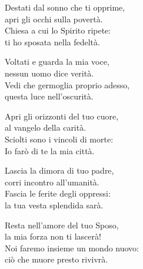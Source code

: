 

\spazio

\strofa Destati dal sonno che ti opprime,\\
apri gli occhi sulla povertà.\\
Chiesa a cui lo Spirito ripete:\\
ti ho sposata nella fedeltà.

\spazio


\spazio

\strofa Voltati e guarda la mia voce,\\
nessun uomo dice verità.\\
Vedi che germoglia proprio adesso,\\
questa luce nell'oscurità.

\spazio


\spazio

\strofa Apri gli orizzonti del tuo cuore,\\
al vangelo della carità.\\
Sciolti sono i vincoli di morte:\\
Io farò di te la mia città.

\spazio


\spazio

\strofa Lascia la dimora di tuo padre,\\
corri incontro all'umanità.\\
Fascia le ferite degli oppressi:\\
la tua vesta splendida sarà.

\spazio


\spazio

\strofa Resta nell'amore del tuo Sposo,\\
la mia forza non ti lascerà!\\
Noi faremo insieme un mondo nuovo:\\
ciò che muore presto rivivrà.

\spazio

